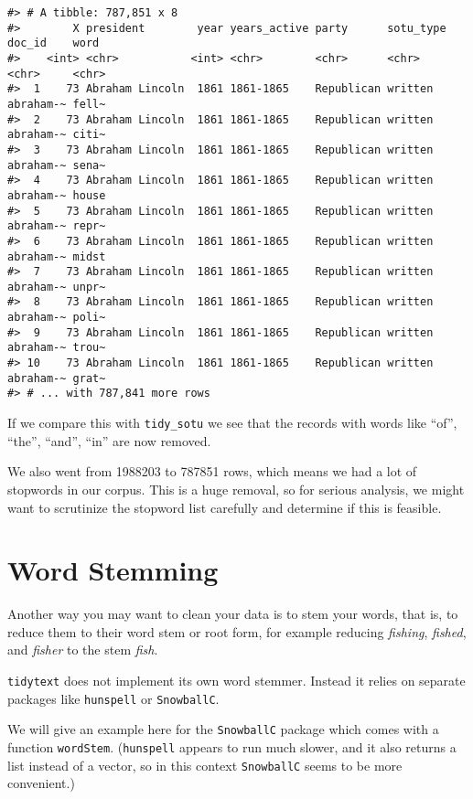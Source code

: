 \documentclass[
]{book}
\begin{document}
\begin{verbatim}
#> # A tibble: 787,851 x 8
#>        X president        year years_active party      sotu_type doc_id    word 
#>    <int> <chr>           <int> <chr>        <chr>      <chr>     <chr>     <chr>
#>  1    73 Abraham Lincoln  1861 1861-1865    Republican written   abraham-~ fell~
#>  2    73 Abraham Lincoln  1861 1861-1865    Republican written   abraham-~ citi~
#>  3    73 Abraham Lincoln  1861 1861-1865    Republican written   abraham-~ sena~
#>  4    73 Abraham Lincoln  1861 1861-1865    Republican written   abraham-~ house
#>  5    73 Abraham Lincoln  1861 1861-1865    Republican written   abraham-~ repr~
#>  6    73 Abraham Lincoln  1861 1861-1865    Republican written   abraham-~ midst
#>  7    73 Abraham Lincoln  1861 1861-1865    Republican written   abraham-~ unpr~
#>  8    73 Abraham Lincoln  1861 1861-1865    Republican written   abraham-~ poli~
#>  9    73 Abraham Lincoln  1861 1861-1865    Republican written   abraham-~ trou~
#> 10    73 Abraham Lincoln  1861 1861-1865    Republican written   abraham-~ grat~
#> # ... with 787,841 more rows
\end{verbatim}

If we compare this with \texttt{tidy\_sotu} we see that the records with words like ``of'', ``the'', ``and'', ``in'' are now removed.

We also went from 1988203 to 787851 rows, which means we had a lot of stopwords in our corpus. This is a huge removal, so for serious analysis, we might want to scrutinize the stopword list carefully and determine if this is feasible.

\hypertarget{word-stemming}{%
\section{Word Stemming}\label{word-stemming}}

Another way you may want to clean your data is to stem your words, that is, to reduce them to their word stem or root form, for example reducing \emph{fishing}, \emph{fished}, and \emph{fisher} to the stem \emph{fish}.

\texttt{tidytext} does not implement its own word stemmer. Instead it relies on separate packages like \texttt{hunspell} or \texttt{SnowballC}.

We will give an example here for the \texttt{SnowballC} package which comes with a function \texttt{wordStem}. (\texttt{hunspell} appears to run much slower, and it also returns a list instead of a vector, so in this context \texttt{SnowballC} seems to be more convenient.)
\end{document}
